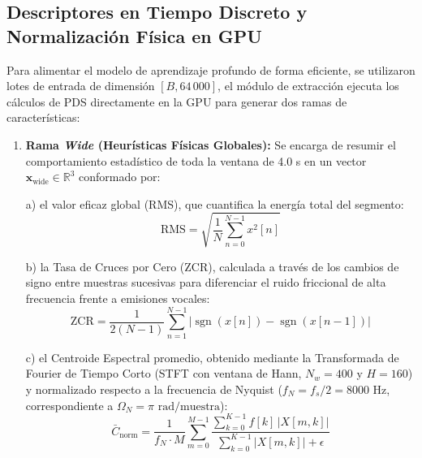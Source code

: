 \documentclass[journal, a4paper]{IEEEtran}
\begin{document}
\subsection{Descriptores en Tiempo Discreto y Normalización Física en GPU}
Para alimentar el modelo de aprendizaje profundo de forma eficiente, se utilizaron lotes de entrada de dimensión $[B, 64\,000]$, el módulo de extracción ejecuta los cálculos de PDS directamente en la GPU para generar dos ramas de características:

\begin{enumerate}
    \item[1)] \textbf{Rama \textit{Wide} (Heurísticas Físicas Globales):} Se encarga de resumir el comportamiento estadístico de toda la ventana de 4.0 s en un vector $\mathbf{x}_{\text{wide}} \in \mathbb{R}^3$ conformado por: 
    
    a) el valor eficaz global (RMS), que cuantifica la energía total del segmento:
    \begin{equation}
        \text{RMS} = \sqrt{\frac{1}{N}\sum_{n=0}^{N-1} x^2[n]} 
    \end{equation}

    b) la Tasa de Cruces por Cero (ZCR), calculada a través de los cambios de signo entre muestras sucesivas para diferenciar el ruido friccional de alta frecuencia frente a emisiones vocales:
    \begin{equation}
        \text{ZCR} = \frac{1}{2(N-1)} \sum_{n=1}^{N-1} |\operatorname{sgn}(x[n]) - \operatorname{sgn}(x[n-1])|
    \end{equation}

    c) el Centroide Espectral promedio, obtenido mediante la Transformada de Fourier de Tiempo Corto (STFT con ventana de Hann, $N_w = 400$ y $H = 160$) y normalizado respecto a la frecuencia de Nyquist ($f_N = f_s / 2 = 8000\text{ Hz}$, correspondiente a $\Omega_N = \pi\text{ rad/muestra}$):
    \begin{equation}
        \bar{C}_{\text{norm}} = \frac{1}{f_N \cdot M} \sum_{m=0}^{M-1} \frac{\sum_{k=0}^{K-1} f[k] \, |X[m, k]|}{\sum_{k=0}^{K-1} |X[m, k]| + \epsilon}
    \end{equation}


\end{enumerate}
\end{document}
